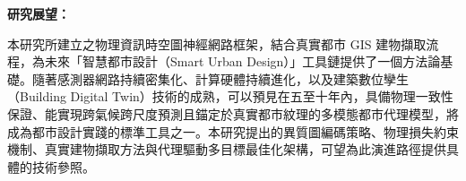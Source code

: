 \noindent\textbf{研究展望：}

本研究所建立之物理資訊時空圖神經網路框架，結合真實都市 GIS 建物擷取流程，為未來「智慧都市設計（Smart Urban Design）」工具鏈提供了一個方法論基礎。隨著感測器網路持續密集化、計算硬體持續進化，以及建築數位孿生（Building Digital Twin）技術的成熟，可以預見在五至十年內，具備物理一致性保證、能實現跨氣候跨尺度預測且錨定於真實都市紋理的多模態都市代理模型，將成為都市設計實踐的標準工具之一。本研究提出的異質圖編碼策略、物理損失約束機制、真實建物擷取方法與代理驅動多目標最佳化架構，可望為此演進路徑提供具體的技術參照。
